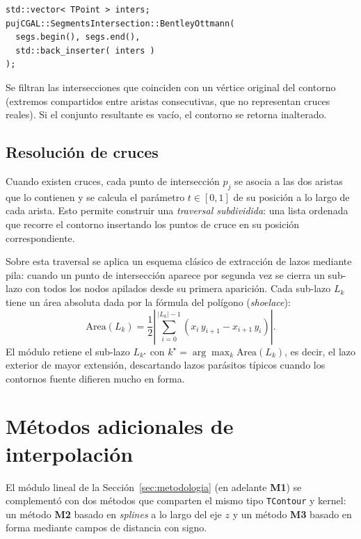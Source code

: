 \documentclass[conference]{IEEEtran}
\begin{document}
\begin{lstlisting}[caption={Invocación del barrido
Bentley--Ottmann de \texttt{pujCGAL}.}]
std::vector< TPoint > inters;
pujCGAL::SegmentsIntersection::BentleyOttmann(
  segs.begin(), segs.end(),
  std::back_inserter( inters )
);
\end{lstlisting}

Se filtran las intersecciones que coinciden con un vértice
original del contorno (extremos compartidos entre aristas
consecutivas, que no representan cruces reales). Si el
conjunto resultante es vacío, el contorno se retorna
inalterado.

\subsection{Resolución de cruces}
Cuando existen cruces, cada punto de intersección $p_j$ se
asocia a las dos aristas que lo contienen y se calcula el
parámetro $t \in [0,1]$ de su posición a lo largo de cada
arista. Esto permite construir una \emph{traversal subdividida}:
una lista ordenada que recorre el contorno insertando los
puntos de cruce en su posición correspondiente.

Sobre esta traversal se aplica un esquema clásico de
extracción de lazos mediante pila: cuando un punto de
intersección aparece por segunda vez se cierra un sub-lazo
con todos los nodos apilados desde su primera aparición. Cada
sub-lazo $L_k$ tiene un área absoluta dada por la fórmula del
polígono (\emph{shoelace}):
\begin{equation}
  \mathrm{Area}(L_k) =
  \frac{1}{2}
  \left|
    \sum_{i=0}^{|L_k|-1}
    (x_i \, y_{i+1} - x_{i+1} \, y_i)
  \right|.
\end{equation}
El módulo retiene el sub-lazo $L_{k^{\star}}$ con
$k^{\star} = \arg\max_k \mathrm{Area}(L_k)$, es decir, el lazo
exterior de mayor extensión, descartando lazos parásitos
típicos cuando los contornos fuente difieren mucho en forma.

\section{Métodos adicionales de interpolación}
\label{sec:metodos2}
El módulo lineal de la Sección~\ref{sec:metodologia} (en adelante
\textbf{M1}) se complementó con dos métodos que comparten el mismo tipo
\texttt{TContour} y kernel: un método \textbf{M2} basado en \emph{splines}
a lo largo del eje $z$ y un método \textbf{M3} basado en forma mediante
campos de distancia con signo.
\end{document}
